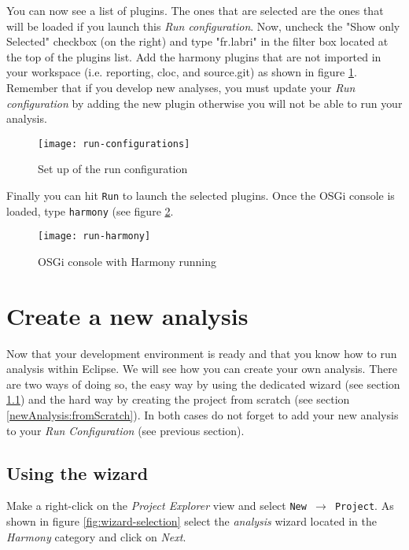 You can now see a list of plugins. The ones that are selected are the ones that will be loaded if you launch this \emph{Run configuration}. Now, uncheck the "Show only Selected" checkbox (on the right) and type "fr.labri" in the filter box located at the top of the plugins list. Add the harmony plugins that are not imported in your workspace (i.e. reporting, cloc, and source.git) as shown in figure \ref{fig:run-configurations}. Remember that if you develop new analyses, you must update your \emph{Run configuration} by adding the new plugin otherwise you will not be able to run your analysis.

	\begin{figure}[H]
		\centering
		\texttt{[image: run-configurations]}
		\caption{Set up of the run configuration}
		\label{fig:run-configurations}
	\end{figure}

Finally you can hit \texttt{Run} to launch the selected plugins. Once the OSGi console is loaded, type \texttt{harmony} (see figure \ref{fig:run-harmony}.

	\begin{figure}[H]
		\centering
		\texttt{[image: run-harmony]}
		\caption{OSGi console with Harmony running}
		\label{fig:run-harmony}
	\end{figure}


\section{Create a new analysis}

Now that your development environment is ready and that you know how to run analysis within Eclipse. We will see how you can create your own analysis. There are two ways of doing so, the easy way by using the dedicated wizard (see section \ref{newAnalysis:wizard}) and the hard way by creating the project from scratch (see section \ref{newAnalysis:fromScratch}). In both cases do not forget to add your new analysis to your \emph{Run Configuration} (see previous section).

\subsection{Using the wizard}\label{newAnalysis:wizard}

Make a right-click on the \emph{Project Explorer} view and select \texttt{New $\rightarrow$ Project}. As shown in figure \ref{fig:wizard-selection} select the \emph{analysis} wizard located in the \emph{Harmony} category and click on \emph{Next}.

